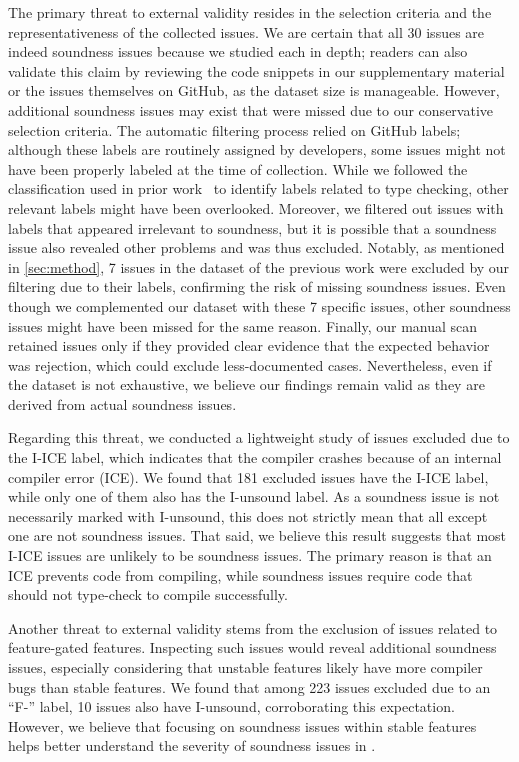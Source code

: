 The primary threat to external validity resides in the selection criteria and
the representativeness of the collected issues.
%
We are certain that all 30 issues are indeed soundness issues because we studied
each in depth;
%
readers can also validate this claim by reviewing the code snippets in our
supplementary material~\cite{supp} or the issues themselves on GitHub, as the
dataset size is manageable.
%
However, additional soundness issues may exist that were missed due to our
conservative selection criteria.
%
The automatic filtering process relied on GitHub labels;
%
although these labels are routinely assigned by \rustc{} developers, some issues
might not have been properly labeled at the time of collection.
%
While we followed the classification used in prior work~\cite{liu2025empiricala}
to identify labels related to type checking, other relevant labels might have
been overlooked.
%
Moreover, we filtered out issues with labels that appeared irrelevant to
soundness, but it is possible that a soundness issue also revealed other
problems and was thus excluded.
%
Notably, as mentioned in \cref{sec:method}, 7 issues in the dataset of the
previous work were excluded by our filtering due to their labels, confirming the
risk of missing soundness issues.
%
Even though we complemented our dataset with these 7 specific issues, other
soundness issues might have been missed for the same reason.
%
Finally, our manual scan retained issues only if they provided clear evidence
that the expected behavior was rejection, which could exclude less-documented
cases.
%
Nevertheless, even if the dataset is not exhaustive, we believe our findings
remain valid as they are derived from actual soundness issues.

Regarding this threat, we conducted a lightweight study of issues excluded due
to the I-ICE label, which indicates that the compiler crashes because of an
internal compiler error (ICE).
%
We found that 181 excluded issues have the I-ICE label, while only one of them
also has the I-unsound label.
%
As a soundness issue is not necessarily marked with I-unsound, this does not
strictly mean that all except one are not soundness issues.
%
That said, we believe this result suggests that most I-ICE issues are unlikely
to be soundness issues.
%
The primary reason is that an ICE prevents code from compiling, while soundness
issues require code that should not type-check to compile successfully.

Another threat to external validity stems from the exclusion of issues related
to feature-gated features.
%
Inspecting such issues would reveal additional soundness issues, especially
considering that unstable features likely have more compiler bugs than stable
features.
%
We found that among 223 issues excluded due to an ``F-'' label, 10 issues also
have I-unsound, corroborating this expectation.
%
However, we believe that focusing on soundness issues within stable features
helps better understand the severity of soundness issues in \rustc{}.

